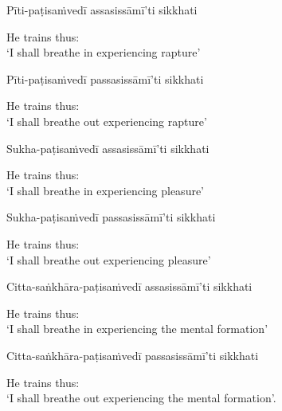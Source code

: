Pīti-paṭisaṁvedī assasissāmī'ti sikkhati

\begin{english}
  He trains thus:\\
  `I shall breathe in experiencing rapture'
\end{english}

Pīti-paṭisaṁvedī passasissāmī'ti sikkhati

\begin{english}
  He trains thus:\\
  `I shall breathe out experiencing rapture'
\end{english}

Sukha-paṭisaṁvedī assasissāmī'ti sikkhati

\begin{english}
  He trains thus:\\
  `I shall breathe in experiencing pleasure'
\end{english}

Sukha-paṭisaṁvedī passasissāmī'ti sikkhati

\begin{english}
  He trains thus:\\
  `I shall breathe out experiencing pleasure'
\end{english}

Citta-saṅkhāra-paṭisaṁvedī assasissāmī'ti sikkhati

\begin{english}
  He trains thus:\\
  `I shall breathe in experiencing the mental formation'\ifdigitalversion\makeatletter\hyperlink{endnote69-appendix}\makeatother\fi
\end{english}

Citta-saṅkhāra-paṭisaṁvedī passasissāmī'ti sikkhati

\begin{english}
  He trains thus:\\
  `I shall breathe out experiencing the mental formation'.
\end{english}


